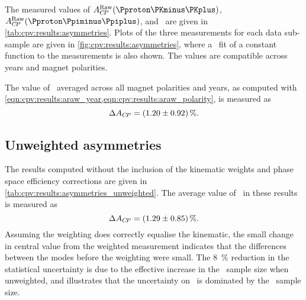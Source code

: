 The measured values of $\ARaw(\pKK)$, $\ARaw(\ppipi)$, and \dACP\ are given in 
\cref{tab:cpv:results:asymmetries}.
Plots of the three measurements for each data sub-sample are given in 
\cref{fig:cpv:results:asymmetries}, where a \chisq\ fit of a constant function 
to the measurements is also shown.
The values are compatible across years and magnet polarities.

The value of \dACP\ averaged across all magnet polarities and years, as 
computed with \cref{eqn:cpv:results:araw_year,eqn:cpv:results:araw_polarity}, 
is measured as
\begin{equation*}
  \dACP = \deltaACP.
  \label{eqn:cpv:results:dacp}
\end{equation*}

\subsection{Unweighted asymmetries}

The results computed without the inclusion of the kinematic weights and phase 
space efficiency corrections are given in 
\cref{tab:cpv:results:asymmetries_unweighted}.
The average value of \dACP\ in these results is measured as
\begin{equation*}
  \dACP = \deltaACPUnweighted.
\end{equation*}
Assuming the weighting does correctly equalise the kinematic, the small change 
in central value from the weighted measurement indicates that the differences 
between the modes before the weighting were small.
The \SI{8}{\percent} reduction in the statistical uncertainty is due to the 
effective increase in the \ppipi\ sample size when unweighted, and illustrates 
that the uncertainty on \dACP\ is dominated by the \pKK\ sample size.

\begin{table}
  \centering
  \caption{%
    Measured asymmetries for each data sub-sample and combination of 
    sub-samples.
    The computation of the combinations, ``2011 + 2012'' and ``Average'', is 
    defined in \cref{chap:cpv:results:combination}.
  }
  \label{tab:cpv:results:asymmetries}
    
\end{table}

\begin{table}
  \centering
  \caption{%
    Measured asymmetries for each data sub-sample and combination of 
    sub-samples without the inclusion of the kinematic weights and phase space 
    efficiency correction.
    The computation of the combinations, ``2011 + 2012'' and ``Average'', is 
    defined in \cref{chap:cpv:results:combination}.
  }
  \label{tab:cpv:results:asymmetries_unweighted}
    
\end{table}

